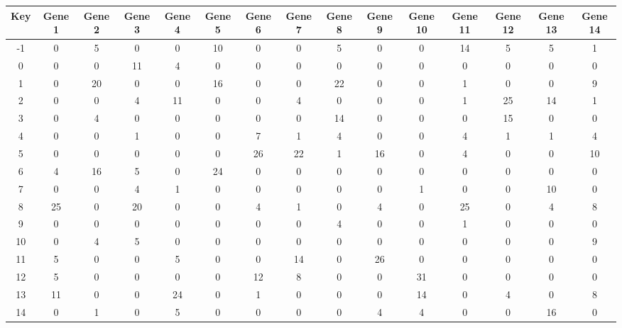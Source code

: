 \begin{tabular}{|c|c|c|c|c|c|c|c|c|c|c|c|c|c|c|}
\hline
Key & Gene 1 & Gene 2 & Gene 3 & Gene 4 & Gene 5 & Gene 6 & Gene 7 & Gene 8 & Gene 9 & Gene 10 & Gene 11 & Gene 12 & Gene 13 & Gene 14 \\
\hline
-1 & 0 & 5 & 0 & 0 & 10 & 0 & 0 & 5 & 0 & 0 & 14 & 5 & 5 & 1 \\
0 & 0 & 0 & 11 & 4 & 0 & 0 & 0 & 0 & 0 & 0 & 0 & 0 & 0 & 0 \\
1 & 0 & 20 & 0 & 0 & 16 & 0 & 0 & 22 & 0 & 0 & 1 & 0 & 0 & 9 \\
2 & 0 & 0 & 4 & 11 & 0 & 0 & 4 & 0 & 0 & 0 & 1 & 25 & 14 & 1 \\
3 & 0 & 4 & 0 & 0 & 0 & 0 & 0 & 14 & 0 & 0 & 0 & 15 & 0 & 0 \\
4 & 0 & 0 & 1 & 0 & 0 & 7 & 1 & 4 & 0 & 0 & 4 & 1 & 1 & 4 \\
5 & 0 & 0 & 0 & 0 & 0 & 26 & 22 & 1 & 16 & 0 & 4 & 0 & 0 & 10 \\
6 & 4 & 16 & 5 & 0 & 24 & 0 & 0 & 0 & 0 & 0 & 0 & 0 & 0 & 0 \\
7 & 0 & 0 & 4 & 1 & 0 & 0 & 0 & 0 & 0 & 1 & 0 & 0 & 10 & 0 \\
8 & 25 & 0 & 20 & 0 & 0 & 4 & 1 & 0 & 4 & 0 & 25 & 0 & 4 & 8 \\
9 & 0 & 0 & 0 & 0 & 0 & 0 & 0 & 4 & 0 & 0 & 1 & 0 & 0 & 0 \\
10 & 0 & 4 & 5 & 0 & 0 & 0 & 0 & 0 & 0 & 0 & 0 & 0 & 0 & 9 \\
11 & 5 & 0 & 0 & 5 & 0 & 0 & 14 & 0 & 26 & 0 & 0 & 0 & 0 & 0 \\
12 & 5 & 0 & 0 & 0 & 0 & 12 & 8 & 0 & 0 & 31 & 0 & 0 & 0 & 0 \\
13 & 11 & 0 & 0 & 24 & 0 & 1 & 0 & 0 & 0 & 14 & 0 & 4 & 0 & 8 \\
14 & 0 & 1 & 0 & 5 & 0 & 0 & 0 & 0 & 4 & 4 & 0 & 0 & 16 & 0 \\
\hline
\end{tabular}